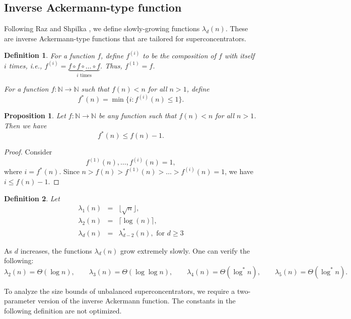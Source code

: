 \documentclass[11pt]{article}
\newtheorem{definition}{Definition}
\newtheorem{proposition}{Proposition}
\begin{document}
\subsection{Inverse Ackermann-type function}

Following Raz and Shpilka \cite{raz2001lower}, we define slowly-growing functions $\lambda_d(n)$. These are inverse Ackermann-type functions that are tailored for superconcentrators.

\begin{definition} For a function $f$, define $f^{(i)}$ to be the composition of $f$ with itself $i$ times, i.e., $f^{(i)} = \underbrace{f\circ f\circ \ldots \circ f}_{i \text{ times}}$. Thus, $f^{(1)} = f$.

For a function $f: \mathbb{N} \to \mathbb{N}$ such that $f(n) < n$ for all $n > 1$, define
\[
f^*(n) = \min\{ i : f^{(i)}(n) \le 1 \}.
\]
\end{definition}

\begin{proposition} Let $f : \mathbb{N} \to \mathbb{N}$ be any function such that $f(n) < n$ for all $n > 1$. Then we have
\[
f^*(n) \le f(n)-1.
\]
\end{proposition}
\begin{proof}
Consider
\[
f^{(1)}(n), \ldots, f^{(i)}(n) = 1,
\]
where $i = f^*(n)$.
Since $n > f(n) > f^{(1)}(n) > \ldots > f^{(i)}(n) = 1$, we have $i \le f(n) - 1$.
\end{proof}

\begin{definition} \cite{raz2001lower} Let
\begin{eqnarray*}
	\lambda_1(n) &=& \lfloor \sqrt{n} \rfloor, \\
	\lambda_2(n) &=& \lceil \log(n) \rceil, \\
	\lambda_d(n) & = & \lambda_{d-2}^*(n), \text{ for } d \ge 3
\end{eqnarray*}
\end{definition}

As $d$ increases, the functions $\lambda_d(n)$ grow extremely slowly. One can verify the following:
\[
\lambda_2(n) = \Theta(\log n), \qquad
\lambda_3(n) = \Theta(\log\log n), \qquad
\lambda_4(n) = \Theta(\log^* n), \qquad
\lambda_5(n) = \Theta(\log^* n).
\]

To analyze the size bounds of unbalanced superconcentrators, we require a two-parameter version of the inverse Ackermann function. The constants in the following definition are not optimized.
\end{document}
